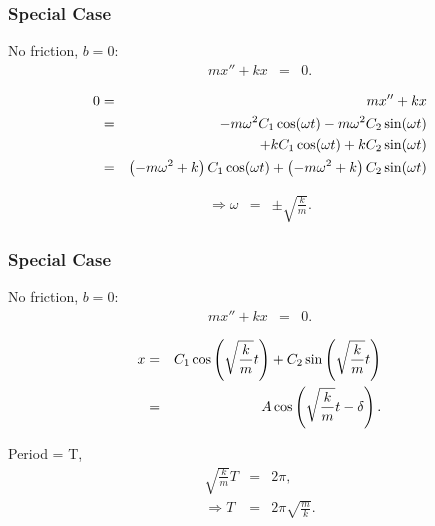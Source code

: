 \begin{frame}
  \frametitle{Special Case}

  No friction, $b=0$:
  \begin{eqnarray*}
    m x'' + kx & = & 0.
  \end{eqnarray*}

  {
    \begin{eqnarray*}
      0 & = & mx''+kx \\
        & = & - m\omega^2 C_1 \cos(\omega t) - m\omega^2 C_2 \sin(\omega t) \\
        &   & + k C_1 \cos(\omega t) + k C_2 \sin(\omega t)\\
        & = & \left( -m \omega^2 + k \right) C_1 \cos(\omega t) +
              \left( -m \omega^2 + k \right) C_2 \sin(\omega t)
    \end{eqnarray*}
  }

  {
    \begin{eqnarray*}
      \Rightarrow \omega & = & \pm \sqrt{\frac{k}{m}}.
    \end{eqnarray*}
  }

  \vfill

\end{frame}


\begin{frame}
  \frametitle{Special Case}

  No friction, $b=0$:
  \begin{eqnarray*}
    m x'' + kx & = & 0.
  \end{eqnarray*}

  \begin{eqnarray*}
    x & = & C_1 \cos\left(\sqrt{\frac{k}{m}} t\right) +
    C_2 \sin\left(\sqrt{\frac{k}{m}} t\right) \\
    & = & A \cos\left( \sqrt{\frac{k}{m}} t - \delta \right).
  \end{eqnarray*}

  Period = T,
  \begin{eqnarray*}
    \sqrt{\frac{k}{m}} T & = & 2\pi, \\
    \Rightarrow T & = & 2 \pi \sqrt{\frac{m}{k}}.
  \end{eqnarray*}

\end{frame}


